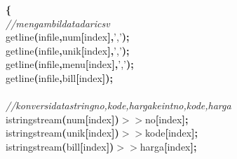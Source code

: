 \documentclass[a4paper, 11pt]{article}
\newcommand\SPC{\hspace*{0.6em}}
\newcommand\TAB{\hspace*{1.2em}}
\newcommand{\CppACharacter}[1]{#1}
\newcommand{\CppAComment}[1]{\textit{\textcolor[rgb]{0,0.47,0.84}{#1}}}
\newcommand{\CppAIdentifier}[1]{#1}
\newcommand{\CppASpace}[1]{\colorbox[rgb]{1,1,1}{#1}}
\newcommand{\CppASymbol}[1]{\textbf{\textcolor[rgb]{1,0,0}{#1}}}
\begin{document}
\begin{ttfamily}
\CppASpace{\TAB }\CppASymbol{\{}\\
\CppASpace{\TAB \TAB }\CppAComment{//mengambil\SPC data\SPC dari\SPC csv}\\
\CppASpace{\TAB \SPC \SPC \SPC \SPC }\CppAIdentifier{getline}\CppASymbol{(}\CppAIdentifier{infile}\CppASymbol{,}\CppASpace{\SPC }\CppAIdentifier{num}\CppASymbol{[}\CppAIdentifier{index}\CppASymbol{]}\CppASymbol{,}\CppASpace{\SPC }\CppACharacter{','}\CppASymbol{)}\CppASymbol{;}\\
\CppASpace{\TAB \SPC \SPC \SPC \SPC }\CppAIdentifier{getline}\CppASymbol{(}\CppAIdentifier{infile}\CppASymbol{,}\CppASpace{\SPC }\CppAIdentifier{unik}\CppASymbol{[}\CppAIdentifier{index}\CppASymbol{]}\CppASymbol{,}\CppASpace{\SPC }\CppACharacter{','}\CppASpace{\SPC }\CppASymbol{)}\CppASymbol{;}\\
\CppASpace{\TAB \SPC \SPC \SPC \SPC }\CppAIdentifier{getline}\CppASymbol{(}\CppAIdentifier{infile}\CppASymbol{,}\CppASpace{\SPC }\CppAIdentifier{menu}\CppASymbol{[}\CppAIdentifier{index}\CppASymbol{]}\CppASymbol{,}\CppASpace{\SPC }\CppACharacter{','}\CppASpace{\SPC }\CppASymbol{)}\CppASymbol{;}\\
\CppASpace{\TAB \SPC \SPC \SPC \SPC }\CppAIdentifier{getline}\CppASymbol{(}\CppAIdentifier{infile}\CppASymbol{,}\CppASpace{\SPC }\CppAIdentifier{bill}\CppASymbol{[}\CppAIdentifier{index}\CppASymbol{]}\CppASymbol{)}\CppASymbol{;}\\
\CppASpace{\TAB \SPC \SPC \SPC \SPC }\\
\CppASpace{\TAB \SPC \SPC \SPC \SPC }\CppAComment{//konversi\SPC data\SPC string\SPC no,\SPC kode,\SPC harga\SPC ke\SPC int\SPC no,\SPC kode,\SPC harga}\\
\CppASpace{\TAB \TAB }\CppAIdentifier{istringstream}\CppASymbol{(}\CppAIdentifier{num}\CppASymbol{[}\CppAIdentifier{index}\CppASymbol{]}\CppASymbol{)}\CppASpace{\SPC }\CppASymbol{$>$$>$}\CppASpace{\SPC }\CppAIdentifier{no}\CppASymbol{[}\CppAIdentifier{index}\CppASymbol{]}\CppASymbol{;}\\
\CppASpace{\TAB \TAB }\CppAIdentifier{istringstream}\CppASymbol{(}\CppAIdentifier{unik}\CppASymbol{[}\CppAIdentifier{index}\CppASymbol{]}\CppASymbol{)}\CppASpace{\SPC }\CppASymbol{$>$$>$}\CppASpace{\SPC }\CppAIdentifier{kode}\CppASymbol{[}\CppAIdentifier{index}\CppASymbol{]}\CppASymbol{;}\\
\CppASpace{\TAB \TAB }\CppAIdentifier{istringstream}\CppASymbol{(}\CppAIdentifier{bill}\CppASymbol{[}\CppAIdentifier{index}\CppASymbol{]}\CppASymbol{)}\CppASpace{\SPC }\CppASymbol{$>$$>$}\CppASpace{\SPC }\CppAIdentifier{harga}\CppASymbol{[}\CppAIdentifier{index}\CppASymbol{]}\CppASymbol{;}\\

\end{ttfamily}
\end{document}

